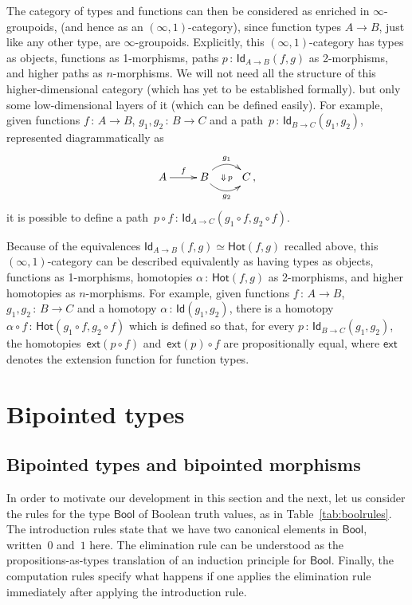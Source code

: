 \documentclass[10pt,a4paper,oneside,reqno]{amsart}
\numberwithin{equation}{section}
\theoremstyle{mythm}
\theoremstyle{mydef}
\theoremstyle{myrmk}
\newcommand{\co}{\,{:}\,}
\newcommand{\Hot}{\mathsf{Hot}}
\newcommand{\ext}{\mathsf{ext}}
\newcommand{\Bool}{\mathsf{Bool}}
\newcommand{\Id}{\mathsf{Id}}
\begin{document}
The category of types and functions can then be considered as enriched in $\infty$-groupoids,
(and hence as an $(\infty, 1)$-category),  since function types  $A \to B$, just like any other type,
are $\infty$-groupoids. Explicitly, this $(\infty, 1)$-category has types as objects,
functions as 1-morphisms, paths $p \co \Id_{A \to B}(f, g)$ as 2-morphisms, and higher paths as $n$-morphisms. We will not need all the structure of this higher-dimensional category (which has yet to be established formally). but only some low-dimensional layers of it (which can be defined easily).  For example, given functions $f \co A \to B$, $g_1, g_2 \co B \to C$ and a path~$p \co \Id_{B \to C}(g_1, g_2)$, represented diagrammatically as 
\[
\xymatrix{
A \ar[r]^{f} & B \ar@/^1pc/[r]^{g_1} \ar@/_1pc/[r]_{g_2} \ar@{}[r]|{\Downarrow \, p}  & C \, ,}
\]
it is possible to define a path~$p \circ f \co \Id_{A \to C} (g_1 \circ f,  g_2 \circ f)$. 

Because of the equivalences $\Id_{A \to B}(f,g) \simeq \Hot(f,g)$ recalled above, this $(\infty,1)$-category can be described equivalently
as having  types as objects, functions as 1-morphisms, homotopies $\alpha \co \Hot(f, g)$ as 2-morphisms, and higher homotopies as $n$-morphisms. For example, given functions $f \co A \to B$, $g_1, g_2 \co B \to C$ and a homotopy $\alpha \co \Id(g_1, g_2)$, there is a homotopy~$\alpha \circ f \co \Hot(g_1 \circ f, g_2 \circ f)$ which is defined so that, for every $p \co \Id_{B \to C}(g_1, g_2)$, the homotopies~$\ext( p \circ f )$ and~$\ext(p) \circ f$ are propositionally equal, where $\ext$ denotes the extension function for function types.



\section{Bipointed types}
\label{sec:bip}

\subsection*{Bipointed types and bipointed morphisms} \label{sec:biptm}
In order to motivate our development in this section and the next, 
let us consider the rules for the type $\Bool$ of Boolean truth values, as in Table~\ref{tab:boolrules}. The introduction rules state that we have two canonical elements in $\Bool$, written~$0$ and~$1$ here. The elimination rule can be understood as the propositions-as-types translation of an induction principle for $\Bool$. Finally, the computation rules specify what happens if one applies the elimination rule immediately after applying the introduction rule.
\end{document}
